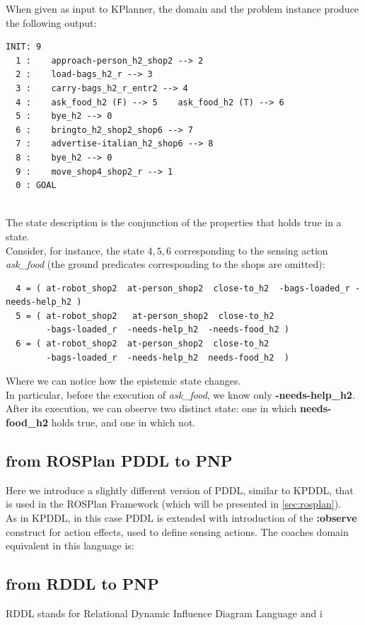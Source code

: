 \documentclass[pdftex,12pt,a4paper]{report}
\begin{document}
\noindent When given as input to KPlanner, the domain and the problem instance produce the following output:
\begin{verbatim}
INIT: 9
  1 :    approach-person_h2_shop2 --> 2 
  2 :    load-bags_h2_r --> 3 
  3 :    carry-bags_h2_r_entr2 --> 4 
  4 :    ask_food_h2 (F) --> 5    ask_food_h2 (T) --> 6 
  5 :    bye_h2 --> 0 
  6 :    bringto_h2_shop2_shop6 --> 7 
  7 :    advertise-italian_h2_shop6 --> 8 
  8 :    bye_h2 --> 0 
  9 :    move_shop4_shop2_r --> 1 
  0 : GOAL
\end{verbatim}\\
\noindent The state description is the conjunction of the properties that holds true in a state.\\ 
Consider, for instance, the state $4,5,6$ corresponding to the sensing action \textit{ask\_food} (the ground predicates corresponding to the shops are omitted): 
\begin{verbatim}
  4 = ( at-robot_shop2  at-person_shop2  close-to_h2  -bags-loaded_r -needs-help_h2 )
  5 = ( at-robot_shop2   at-person_shop2  close-to_h2  
        -bags-loaded_r  -needs-help_h2  -needs-food_h2 )
  6 = ( at-robot_shop2  at-person_shop2  close-to_h2  
        -bags-loaded_r  -needs-help_h2  needs-food_h2  )
\end{verbatim}
Where we can notice how the epistemic state changes.\\ 
In particular, before the execution of  \textit{ask\_food}, we know only \textbf{-needs-help\_h2}. After its execution, we can observe two distinct state: one in which \textbf{needs-food\_h2} holds true, and one in which not.

\subsection{from ROSPlan PDDL to PNP}
Here we introduce a slightly different version of PDDL, similar to KPDDL, that is used in the ROSPlan Framework (which will be presented in \ref{sec:rosplan}).\\
As in KPDDL, in this case PDDL is extended with introduction of the \textbf{:observe} construct for action effects, used to define sensing actions.
The coaches domain equivalent in this language is:

\subsection{from RDDL to PNP}
RDDL\cite{sanner2010relational} stands for Relational Dynamic Influence Diagram Language and i
\end{document}
